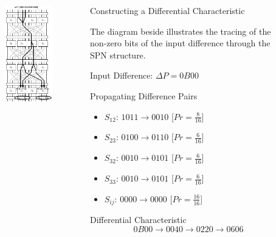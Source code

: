 \documentclass[9pt]{beamer}
\begin{document}
\begin{frame}

\begin{columns}
\begin{column}{0.4\textwidth}
\begin{figure}
\includegraphics[totalheight=0.8\textheight]{spn_diff_char.jpg}
\end{figure}
\end{column}

\begin{column}{0.6\textwidth}
Constructing a Differential Characteristic

\vspace{5mm}
\pause The diagram beside illustrates the tracing of the non-zero bits of the input difference through the SPN structure.

\vspace{2mm}
Input Difference: $\Delta P = 0B00$

\vspace{2mm}
\pause Propagating Difference Pairs
\begin{itemize}[<+->]
\item{$S_{12}$: $1011 \rightarrow 0010$ [$Pr = \frac{8}{16}$]}
\item{$S_{23}$: $0100 \rightarrow 0110$ [$Pr = \frac{6}{16}$]}
\item{$S_{32}$: $0010 \rightarrow 0101$ [$Pr = \frac{6}{16}$]}
\item{$S_{33}$: $0010 \rightarrow 0101$ [$Pr = \frac{6}{16}$]}
\item{$S_{ij}$: $0000 \rightarrow 0000$ [$Pr = \frac{16}{16}$]}
\end{itemize}

\vspace{2mm}
\pause Differential Characteristic
\[ 0B00 \rightarrow 0040 \rightarrow 0220 \rightarrow 0606 \]
\end{column}
\end{columns}
\end{frame}
\end{document}

